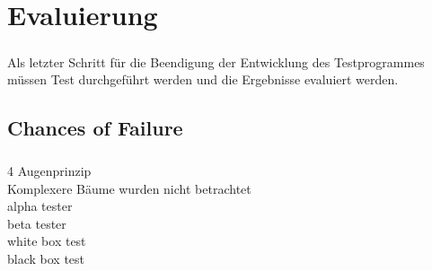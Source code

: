 \chapter{Evaluierung}\label{chp:Evaluierung}
\paragraph{}

Als letzter Schritt für die Beendigung der Entwicklung des Testprogrammes müssen Test durchgeführt werden und die Ergebnisse evaluiert werden.

\section{Chances of Failure}
\paragraph{}
4 Augenprinzip\\
Komplexere Bäume wurden nicht betrachtet\\
alpha tester\\
beta tester\\
white box test\\
black box test\\